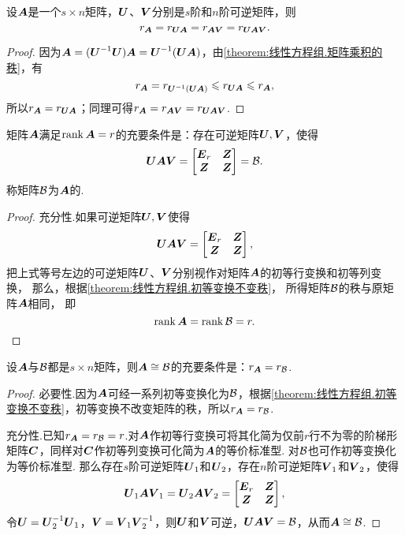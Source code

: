 \begin{corollary}
设\(\boldsymbol{A}\)是一个\(s \times n\)矩阵，\(\P\)、\(\Q\)分别是\(s\)阶和\(n\)阶可逆矩阵，则\[
r_{\A} = r_{\P \A} = r_{\A \Q} = r_{\P \A \Q}.
\]
\begin{proof}
因为\(\A = (\P^{-1} \P) \A = \P^{-1} (\P \A)\)，由\cref{theorem:线性方程组.矩阵乘积的秩}，有\[
r_{\A} = r_{\P^{-1} (\P \A)} \leqslant r_{\P \A} \leqslant r_{\A},
\]所以\(r_{\A} = r_{\P \A}\)；同理可得\(r_{\A} = r_{\A \Q} = r_{\P \A \Q}\).
\end{proof}
\end{corollary}

\begin{theorem}
矩阵\(\boldsymbol{A}\)满足\(\rank\boldsymbol{A}=r\)的充要条件是：存在可逆矩阵\(\P,\Q\)，使得\[
\P \A \Q = \begin{bmatrix}
\E_r & \z \\ \z & \z
\end{bmatrix} = \B.
\]\rm
称矩阵\(\mathcal{B}\)为\(\boldsymbol{A}\)的.
\begin{proof}
充分性.如果可逆矩阵\(\P,\Q\)使得\[
\P\A\Q = \begin{bmatrix}
\E_r & \z \\ \z & \z
\end{bmatrix},
\]
把上式等号左边的可逆矩阵\(\P\)、\(\Q\)分别视作对矩阵\(\boldsymbol{A}\)的初等行变换和初等列变换，%
那么，根据\cref{theorem:线性方程组.初等变换不变秩}，%
所得矩阵\(\mathcal{B}\)的秩与原矩阵\(\boldsymbol{A}\)相同，%
即\[
\rank\boldsymbol{A} = \rank\mathcal{B} = r.
\qedhere
\]
\end{proof}
\end{theorem}

\begin{theorem}
设\(\boldsymbol{A}\)与\(\mathcal{B}\)都是\(s \times n\)矩阵，则\(\boldsymbol{A} \cong \mathcal{B}\)的充要条件是：\(r_{\boldsymbol{A}} = r_{\mathcal{B}}\).
\begin{proof}
必要性.因为\(\boldsymbol{A}\)可经一系列初等变换化为\(\mathcal{B}\)，根据\cref{theorem:线性方程组.初等变换不变秩}，初等变换不改变矩阵的秩，所以\(r_{\boldsymbol{A}} = r_{\mathcal{B}}\).

充分性.已知\(r_{\boldsymbol{A}} = r_{\mathcal{B}} = r\).对\(\boldsymbol{A}\)作初等行变换可将其化简为仅前\(r\)行不为零的阶梯形矩阵\(\boldsymbol{C}\)，同样对\(\boldsymbol{C}\)作初等列变换可化简为\(\boldsymbol{A}\)的等价标准型.
对\(\mathcal{B}\)也可作初等变换化为等价标准型.
那么存在\(s\)阶可逆矩阵\(\P_1\)和\(\P_2\)，存在\(n\)阶可逆矩阵\(\Q_1\)和\(\Q_2\)，使得\[
\P_1 \A \Q_1 = \P_2 \A \Q_2 = \begin{bmatrix} \E_r & \z \\ \z & \z \end{bmatrix},
\]令\(\P = \P_2^{-1} \P_1\)，\(\Q = \Q_1 \Q_2^{-1}\)，则\(\P\)和\(\Q\)可逆，\(\P \A \Q = \B\)，从而\(\boldsymbol{A} \cong \mathcal{B}\).
\end{proof}
\end{theorem}

